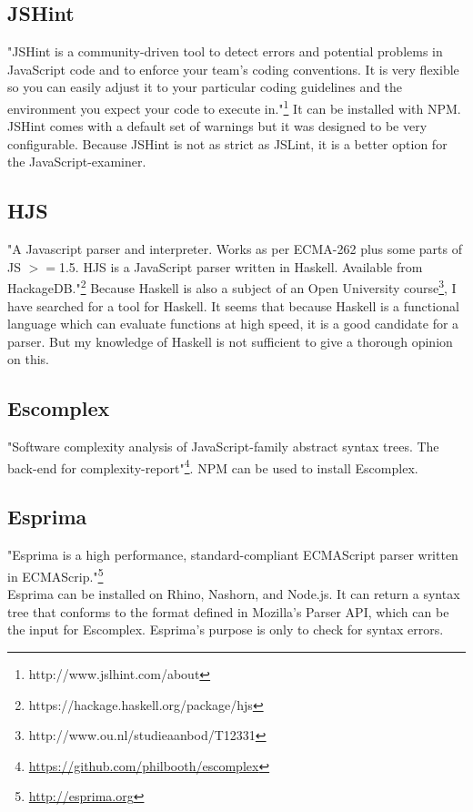\documentclass{article}
\begin{document}
\subsection{JSHint}
"JSHint is a community-driven tool to detect errors and potential problems in JavaScript code and to enforce your team's coding conventions. It is very flexible so you can easily adjust it to your particular coding guidelines and the environment you expect your code to execute in."\footnote{http://www.jslhint.com/about}
It can be installed with NPM.
JSHint comes with a default set of warnings but it was designed to be very configurable.
Because JSHint is not as strict as JSLint, it is a better option for the JavaScript-examiner.

\subsection{HJS}
"A Javascript parser and interpreter. Works as per ECMA-262 plus some parts of JS $>=$1.5.
HJS is a JavaScript parser written in Haskell. Available from HackageDB."\footnote{https://hackage.haskell.org/package/hjs}
Because Haskell is also a subject of an Open University course\footnote{http://www.ou.nl/studieaanbod/T12331}, I have searched for a tool for Haskell.
It seems that because Haskell is a functional language which can evaluate functions at high speed, it is a good candidate for a parser.
But my knowledge of Haskell is not sufficient to give a thorough opinion on this.

\subsection{Escomplex}
"Software complexity analysis of JavaScript-family abstract syntax trees. The back-end for complexity-report"\footnote{\url{https://github.com/philbooth/escomplex}}.
NPM can be used to install Escomplex.

\subsection{Esprima}
"Esprima is a high performance, standard-compliant ECMAScript parser written in ECMAScrip."\footnote{\url{http://esprima.org}}\\
Esprima can be installed on Rhino, Nashorn, and Node.js.
It can return a syntax tree that conforms to the format defined in Mozilla's Parser API, which can be the input for Escomplex.
Esprima's purpose is only to check for syntax errors.
\end{document}
